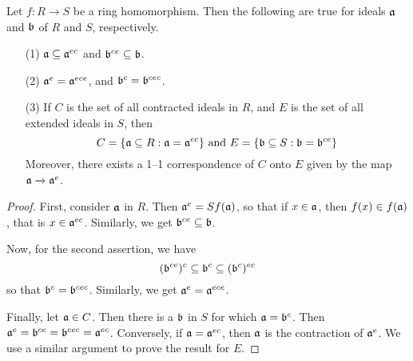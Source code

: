 \begin{lemma}\label{lemma_5.6.4}
    Let $f:R \xrightarrow{} S$ be a ring homomorphism. Then the following are
    true for ideals $\af$ and  $\bf$ of  $R$ and  $S$, respectively.
    \begin{enumerate}
        \item[(1)] $\af \subseteq \af^{ec}$ and $\bf^{ce} \subseteq \bf$.

        \item[(2)] $\af^e=\af^{ece}$, and $\bf^c=\bf^{cec}$.

        \item[(3)] If $C$ is the set of all contracted ideals in $R$, and  $E$
            is the set of all extended ideals in  $S$, then
            \begin{equation*}
                C=\{\af \subseteq R : \af=\af^{ec}\} \text{ and }
                E=\{\bf \subseteq S : \bf=\bf^{ce}\}
            \end{equation*}
            Moreover, there exists a 1--1 correspondence of $C$ onto $E$  given
            by the map $\af \xrightarrow{} \af^e$.
    \end{enumerate}
\end{lemma}
\begin{proof}
    First, consider $\af$ in  $R$. Then  $\af^e=Sf(\af)$, so that if $x \in
    \af$, then  $f(x) \in f(\af)$, that is $x \in \af^{ec}$. Similarly, we
    get $\bf^{ce} \subseteq \bf$.

    Now, for the second assertion, we have
    \begin{equation*}
        (\bf^{ce})^c \subseteq \bf^c \subseteq (\bf^c)^{ec}
    \end{equation*}
    so that $\bf^c=\bf^{cec}$. Similarly, we get $\af^e=\af^{ece}$.

    Finally, let $\af \in C$. Then there is a $\bf$ in $S$ for which
    $\af=\bf^c$. Then  $\af^e=\bf^{ce}=\bf^{cec}=\af^{ec}$. Conversely, if
    $\af=\af^{ec}$, then $\af$ is the contraction of $\af^e$. We use a similar
    argument to prove the result for $E$.
\end{proof}

